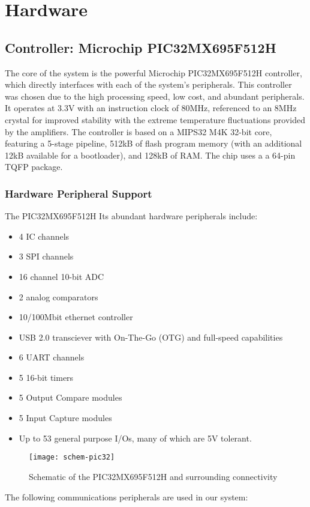 \chapter{Hardware}

\section{Controller: Microchip PIC32MX695F512H}
The core of the system is the powerful Microchip PIC32MX695F512H controller, which directly interfaces with each of the system's peripherals. This controller was chosen due to the high processing speed, low cost, and abundant peripherals. It operates at 3.3V with an instruction clock of 80MHz, referenced to an 8MHz crystal for improved stability with the extreme temperature fluctuations provided by the amplifiers. The controller is based on a MIPS32 M4K 32-bit core, featuring a 5-stage pipeline, 512kB of flash program memory (with an additional 12kB available for a bootloader), and 128kB of RAM. The chip uses a a 64-pin TQFP package.
\subsection{Hardware Peripheral Support}
The PIC32MX695F512H Its abundant hardware peripherals include:
\begin{itemize}
\item 4 IC channels
\item 3 SPI channels
\item 16 channel 10-bit ADC
\item 2 analog comparators
\item 10/100Mbit ethernet controller
\item USB 2.0 transciever with On-The-Go (OTG) and full-speed capabilities
\item 6 UART channels
\item 5 16-bit timers
\item 5 Output Compare modules
\item 5 Input Capture modules
\item Up to 53 general purpose I/Os, many of which are 5V tolerant. 
\end{itemize}
\begin{figure}[H]
	\centering
	\texttt{[image: schem-pic32]}
	\caption[Schematic -- Microcontroller]%
	{Schematic of the PIC32MX695F512H and surrounding connectivity}
\end{figure}
The following communications peripherals are used in our system:
